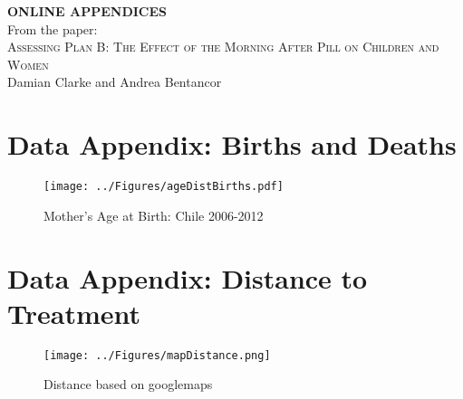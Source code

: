\documentclass[12pt,subeqn]{article}
\begin{document}
\begin{spacing}{1.4}

\begin{center}
\textbf{ONLINE APPENDICES} \\
\vspace{4mm}
From the paper: \\
\vspace{6mm}
{\large \textsc{Assessing Plan B: 
The Effect of the Morning After Pill on Children and Women}} \\
Damian Clarke and Andrea Bentancor
\end{center}

\tableofcontents


\renewcommand\thesection{\Alph{section}}
\renewcommand\figurename{Figure OA}
\renewcommand\tablename{Table OA}

\setlength\parindent{0.25in}
\setlength\parskip{0.25in}

\clearpage
\section{Data Appendix: Births and Deaths}

\begin{figure}[htpb!]
\begin{center}
\caption{Mother's Age at Birth: Chile 2006-2012}
\label{TEENfig:ageHist}
\texttt{[image: ../Figures/ageDistBirths.pdf]} 
\end{center}
\vspace{-4mm}
\end{figure}


\clearpage
\section{Data Appendix: Distance to Treatment}


\begin{figure}[htpb!]
\texttt{[image: ../Figures/mapDistance.png]}
\caption{Distance based on googlemaps}
\label{googdist}
\end{figure}



\end{spacing}
\end{document}
